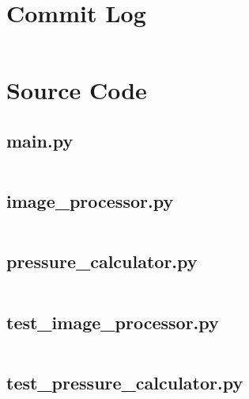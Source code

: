\section{Commit Log}\label{app:commit_log}
\inputminted[breaklines=true]{text}{../git_log.txt}
\clearpage
\section{Source Code}
	\subsection{main.py}
		\inputminted[breaklines,
					linenos,
					frame=lines,
					fontsize=\footnotesize]{python}{../code/final_program/main.py}
	\subsection{image\_processor.py}
		\inputminted[breaklines,
					linenos,
					frame=lines,
					fontsize=\footnotesize]{python}{../code/final_program/image_processor.py}
	\subsection{pressure\_calculator.py}
		\inputminted[breaklines,
					linenos,
					frame=lines,
					fontsize=\footnotesize]{python}{../code/final_program/pressure_calculator.py}
	\subsection{test\_image\_processor.py}
		\inputminted[breaklines,
					linenos,
					frame=lines,
					fontsize=\footnotesize]{python}{../code/final_program/test_image_processor.py}
	\subsection{test\_pressure\_calculator.py}
		\inputminted[breaklines,
					linenos,
					frame=lines,
					fontsize=\footnotesize]{python}{../code/final_program/test_pressure_calculator.py}
\clearpage




